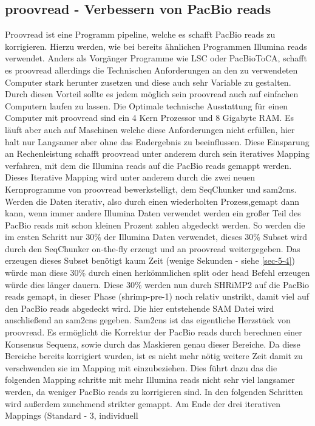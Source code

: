 \documentclass{scrartcl}
\begin{document}
\subsection{proovread - Verbessern von PacBio reads}
\label{sec-3-3}
Proovread ist eine Programm pipeline, welche  es schafft PacBio reads zu korrigieren. 
Hierzu werden, wie bei bereits ähnlichen Programmen Illumina reads verwendet. Anders als Vorgänger Programme wie LSC oder 
PacBioToCA, schafft es proovread allerdings die Technischen Anforderungen an den zu verwendeten Computer stark herunter zusetzen und diese auch sehr Variable zu gestalten. 
Durch diesen Vorteil sollte es jedem möglich sein proovread auch auf einfachen Computern laufen zu lassen. Die Optimale technische Ausstattung für einen Computer 
mit proovread sind ein 4 Kern Prozessor und 8 Gigabyte RAM. Es läuft aber auch auf Maschinen welche diese Anforderungen nicht erfüllen, hier halt nur Langsamer
aber ohne das Endergebnis zu beeinflussen. 
Diese Einsparung an Rechenleistung schafft proovread unter anderem durch sein iteratives Mapping verfahren, mit dem die Illumina reads auf die PacBio reads gemappt werden.
Dieses Iterative Mapping wird unter anderem durch die zwei neuen Kernprogramme von proovread bewerkstelligt, dem SeqChunker und sam2cns. Werden die Daten iterativ, also
durch einen wiederholten Prozess,gemapt dann kann, wenn immer andere Illumina Daten verwendet werden ein großer Teil des PacBio reads mit schon kleinen Prozent zahlen abgedeckt werden.
So werden die im ersten Schritt nur 30\% der Illumina Daten verwendet, dieses 30\% Subset wird durch den SeqChunker on-the-fly erzeugt und an proovread weitergegeben. Das erzeugen 
dieses Subset benötigt kaum Zeit (wenige Sekunden - siehe \ref{sec-5-4}) würde man diese 30\% durch einen herkömmlichen split oder head Befehl erzeugen würde dies länger dauern.
Diese 30\% werden nun durch SHRiMP2 auf die PacBio reads gemapt, in dieser Phase (shrimp-pre-1) noch relativ unstrikt, damit viel auf den PacBio reads abgedeckt wird.
Die hier entstehende SAM Datei wird anschließend an sam2cns gegeben. Sam2cns ist das eigentliche Herzstück von proovread. Es ermöglicht die Korrektur der PacBio reads
durch berechnen einer Konsensus Sequenz, sowie durch das Maskieren genau dieser Bereiche. Da diese Bereiche bereits korrigiert wurden, ist es nicht mehr nötig weitere 
Zeit damit zu verschwenden sie im Mapping mit einzubeziehen. Dies führt dazu das die folgenden Mapping schritte mit mehr Illumina reads nicht sehr viel langsamer werden, da 
weniger PacBio reads zu korrigieren sind. In den folgenden Schritten wird außerdem zunehmend strikter gemappt. Am Ende der drei iterativen Mappings (Standard - 3, individuell
\end{document}
